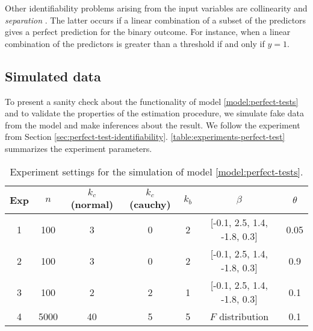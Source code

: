 Other identifiability problems arising from the input variables are
collinearity and {\em separation} \cite[p. 1360-1361]{gelman2008weakly}. 
The latter occurs if a linear combination of a subset of the predictors gives
a perfect prediction for the binary outcome. For instance, when a linear
combination of the predictors is greater than a threshold if and only if $y =
1$.  

\subsection{Simulated data}

To present a sanity check about the functionality of model
\eqref{model:perfect-tests} and to validate the properties of the estimation
procedure, we simulate fake data from the model and make inferences about the
result. We follow the experiment from Section
\ref{sec:perfect-test-identifiability}.
\autoref{table:experiments-perfect-test} summarizes the experiment
parameters. 

\begin{table}[!ht]
  \centering
  \caption{\label{table:experiments-perfect-test}Experiment settings for the
  simulation of model \eqref{model:perfect-tests}.}
  \begin{tabular}{ccccccc}
  \hline
  Exp & $n$ & $k_{c}$ (normal) & $k_{c}$ (cauchy) & $k_{b}$ & $\beta$ & $\theta$ \\ \hline
  \multicolumn{1}{c}{1} & 100 & 3 & 0 & 2 & {[}-0.1, 2.5, 1.4, -1.8, 0.3{]} & 0.05 \\
  \multicolumn{1}{c}{2} & 100 & 3 & 0 & 2 & {[}-0.1, 2.5, 1.4, -1.8, 0.3{]} & 0.9 \\
  \multicolumn{1}{c}{3} & 100 & 2 & 2 & 1 & {[}-0.1, 2.5, 1.4, -1.8, 0.3{]} & 0.1 \\
  \multicolumn{1}{c}{4} & 5000 & 40 & 5 & 5 & $F$ distribution & 0.1 \\\hline
  \end{tabular}
\end{table}

